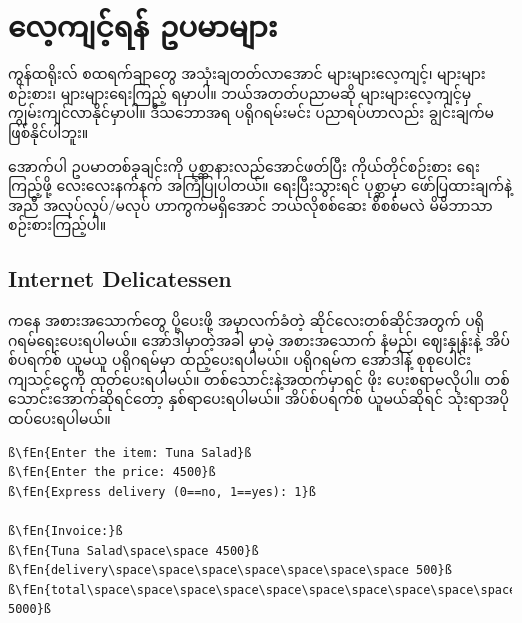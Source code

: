 \section{လေ့ကျင့်ရန် ဥပမာများ}

ကွန်ထရိုးလ် စထရက်ချာတွေ အသုံးချတတ်လာအောင် များများလေ့ကျင့်၊ များများစဉ်းစား၊ များများရေးကြည့် ရမှာပါ။ ဘယ်အတတ်ပညာမဆို များများလေ့ကျင့်မှ ကျွမ်းကျင်လာနိုင်မှာပါ။ ဒီသဘောအရ ပရိုဂရမ်းမင်း ပညာရပ်ဟာလည်း ချွင်းချက်မဖြစ်နိုင်ပါဘူး။

\begin{mytcbox}
အောက်ပါ ဥပမာတစ်ခုချင်းကို ပုစ္ဆာနားလည်အောင်ဖတ်ပြီး ကိုယ်တိုင်စဉ်းစား ရေးကြည့်ဖို့ လေးလေးနက်နက် အကြံပြုပါတယ်။ ရေးပြီးသွားရင် ပုစ္ဆာမှာ ဖော်ပြထားချက်နဲ့ အညီ အလုပ်လုပ်/မလုပ် ဟာကွက်မရှိအောင် ဘယ်လိုစစ်ဆေး စိစစ်မလဲ မိမိဘာသာ စဉ်းစားကြည့်ပါ။
\end{mytcbox}

\subsection*{Internet Delicatessen}
 ကနေ အစားအသောက်တွေ  ပို့ပေးဖို့ အမှာလက်ခံတဲ့ ဆိုင်လေးတစ်ဆိုင်အတွက် ပရိုဂရမ်ရေးပေးရပါမယ်။ အော်ဒါမှာတဲ့အခါ မှာမဲ့ အစားအသောက် နံမည်၊ ဈေးနှုန်းနဲ့ အိပ်စ်ပရက်စ်  ယူမယူ ပရိုဂရမ်မှာ ထည့်ပေးရပါမယ်။ ပရိုဂရမ်က အော်ဒါနဲ့ စုစုပေါင်းကျသင့်ငွေကို ထုတ်ပေးရပါမယ်။ တစ်သောင်းနဲ့အထက်မှာရင်  ဖိုး ပေးစရာမလိုပါ။ တစ်သောင်းအောက်ဆိုရင်တော့ နှစ်ရာပေးရပါမယ်။ အိပ်စ်ပရက်စ်  ယူမယ်ဆိုရင် သုံးရာအပို ထပ်ပေးရပါမယ်။
%
\begin{verbatim}
ß\fEn{Enter the item: Tuna Salad}ß
ß\fEn{Enter the price: 4500}ß
ß\fEn{Express delivery (0==no, 1==yes): 1}ß

ß\fEn{Invoice:}ß
ß\fEn{Tuna Salad\space\space 4500}ß
ß\fEn{delivery\space\space\space\space\space\space\space 500}ß 
ß\fEn{total\space\space\space\space\space\space\space\space\space\space\space 5000}ß
\end{verbatim}
%

